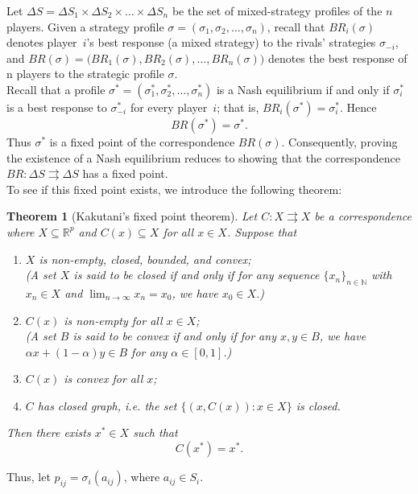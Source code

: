 \documentclass[twoside]{article}
\theoremstyle{definitionstyle}
\newtheorem*{theorem}{Theorem}
\begin{document}
Let $\Delta S = \Delta S_1 \times \Delta S_2 \times \dots \times \Delta S_n$ be the set of mixed-strategy profiles of the $n$ players.
Given a strategy profile $\sigma = (\sigma_1,\sigma_2,\dots,\sigma_n)$, recall that $BR_i(\sigma)$ denotes player~$i$'s best response (a mixed strategy) to the rivals’ strategies $\sigma_{-i}$, and
$BR(\sigma) = \bigl(BR_1(\sigma), BR_2(\sigma), \dots, BR_n(\sigma)\bigr)$
denotes the best response of n players to the strategic profile $\sigma$. \\
Recall that a profile $\sigma^* = (\sigma_1^*,\sigma_2^*,\dots,\sigma_n^*)$ is a Nash equilibrium if and only if $\sigma_i^*$ is a best response to $\sigma_{-i}^*$ for every player~$i$; that is, $BR_i(\sigma^*) = \sigma_i^*$. Hence
\[
BR(\sigma^*) = \sigma^*.
\]
Thus $\sigma^*$ is a fixed point of the correspondence $BR(\sigma)$. Consequently, proving the existence of a Nash equilibrium reduces to showing that the correspondence
$BR : \Delta S \rightrightarrows \Delta S$ has a fixed point.\\
To see if this fixed point exists, we introduce the following theorem: 
\begin{theorem}[Kakutani’s fixed point theorem]
   Let \(C : X \rightrightarrows X\) be a correspondence where \(X \subseteq \mathbb{R}^p\) and \(C(x) \subseteq X\) for all \(x \in X\).
Suppose that

\begin{enumerate}
\item \(X\) is non‑empty, closed, bounded, and convex;  \\
      (A set \(X\) is said to be closed if and only if for any sequence \(\{x_n\}_{n\in\mathbb{N}}\) with \(x_n\in X\) and \(\lim_{n\to\infty} x_n = x_0\), we have \(x_0 \in X\).)
\item \(C(x)\) is non‑empty for all \(x \in X\);\\
   (A set \(B\) is said to be convex if and only if for any \(x,y \in B\), we have \(\alpha x + (1-\alpha)y \in B\) for any \(\alpha\in[0,1]\).)

\item \(C(x)\) is convex for all \(x\);  
      \item \(C\) has closed graph, i.e. the set \(\{(x, C(x)) : x \in X\}\) is closed.
\end{enumerate}

Then there exists \(x^* \in X\) such that
\[
C(x^*) = x^*.
\]
\end{theorem}
Thus, let $p_{ij} = \sigma_i(a_{ij})$, where $a_{ij}\in S_i$.\\
\end{document}
